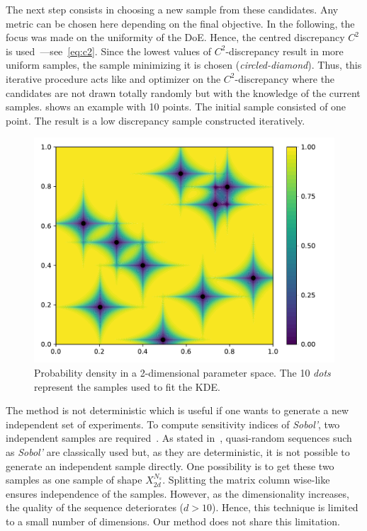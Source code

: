 The next step consists in choosing a new sample from these candidates. Any metric can be chosen here depending on the final objective. In the following, the focus was made on the uniformity of the DoE. Hence, the centred discrepancy $C^2$ is used~\citep{Fang2006}---see~\cref{eq:c2}. Since the lowest values of $C^2$-discrepancy result in more uniform samples, the sample minimizing it is chosen (\emph{circled-diamond}). Thus, this iterative procedure acts like and optimizer on the $C^2$-discrepancy where the candidates are not drawn totally randomly but with the knowledge of the current samples.  shows an example with 10 points. The initial sample consisted of one point. The result is a low discrepancy sample constructed iteratively.

\begin{figure}[!ht]
\centering
\includegraphics[width=0.8\linewidth,keepaspectratio]{fig/contributions/doe/10_star.pdf}
\caption{Probability density in a 2-dimensional parameter space. The 10 \emph{dots} represent the samples used to fit the KDE.}
\label{fig:star}
\end{figure}

The method is not deterministic which is useful if one wants to generate a new independent set of experiments. To compute sensitivity indices of \emph{Sobol'}, two independent samples are required~\citep{Saltelli2010}. As stated in~\citep{Saltelli2010}, quasi-random sequences such as \emph{Sobol'} are classically used but, as they are deterministic, it is not possible to generate an independent sample directly. One possibility is to get these two samples as one sample of shape $X_{2d}^{N_s}$. Splitting the matrix column wise-like ensures independence of the samples. However, as the dimensionality increases, the quality of the sequence deteriorates ($d > 10$). Hence, this technique is limited to a small number of dimensions. Our method does not share this limitation.

